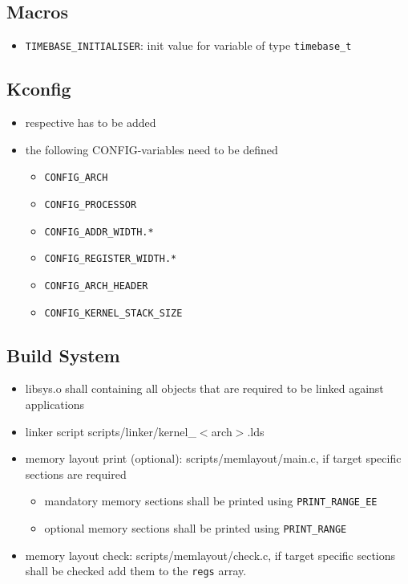 	\subsection{Macros}
		\begin{itemize}
			\item \lstinline{TIMEBASE_INITIALISER}: init value for variable of type \lstinline{timebase_t}\\
		\end{itemize}

	\subsection{Kconfig}
		\begin{itemize}
			\item respective  has to be added
			\item the following CONFIG-variables need to be defined
				\begin{itemize}
					\item \lstinline{CONFIG_ARCH}
					\item \lstinline{CONFIG_PROCESSOR}
					\item \lstinline{CONFIG_ADDR_WIDTH.*}
					\item \lstinline{CONFIG_REGISTER_WIDTH.*}
					\item \lstinline{CONFIG_ARCH_HEADER}
					\item \lstinline{CONFIG_KERNEL_STACK_SIZE}
				\end{itemize}
		\end{itemize}

	\subsection{Build System}
		\begin{itemize}
			\item libsys.o shall containing all objects that are required to be linked against applications
			\item linker script scripts/linker/kernel\_$<$arch$>$.lds
			\item memory layout print (optional): scripts/memlayout/main.c, if target specific sections are required
				\begin{itemize}
					\item mandatory memory sections shall be printed using \lstinline{PRINT_RANGE_EE}
					\item optional memory sections shall be printed using \lstinline{PRINT_RANGE}
				\end{itemize}

			\item memory layout check: scripts/memlayout/check.c, if target specific sections shall be checked add them to the \lstinline{regs} array.
		\end{itemize}

\vfill
\pagebreak

